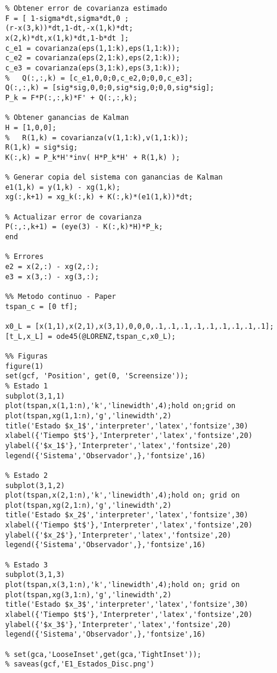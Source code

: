 \begin{verbatim}
	% Obtener error de covarianza estimado
	F = [ 1-sigma*dt,sigma*dt,0 ; 
	(r-x(3,k))*dt,1-dt,-x(1,k)*dt;
	x(2,k)*dt,x(1,k)*dt,1-b*dt ];
	c_e1 = covarianza(eps(1,1:k),eps(1,1:k));
	c_e2 = covarianza(eps(2,1:k),eps(2,1:k));
	c_e3 = covarianza(eps(3,1:k),eps(3,1:k));
	%   Q(:,:,k) = [c_e1,0,0;0,c_e2,0;0,0,c_e3];
	Q(:,:,k) = [sig*sig,0,0;0,sig*sig,0;0,0,sig*sig];
	P_k = F*P(:,:,k)*F' + Q(:,:,k);
	
	% Obtener ganancias de Kalman
	H = [1,0,0];
	%   R(1,k) = covarianza(v(1,1:k),v(1,1:k));
	R(1,k) = sig*sig;
	K(:,k) = P_k*H'*inv( H*P_k*H' + R(1,k) );
	
	% Generar copia del sistema con ganancias de Kalman
	e1(1,k) = y(1,k) - xg(1,k);
	xg(:,k+1) = xg_k(:,k) + K(:,k)*(e1(1,k))*dt;
	
	% Actualizar error de covarianza
	P(:,:,k+1) = (eye(3) - K(:,k)*H)*P_k;  
	end
	
	% Errores
	e2 = x(2,:) - xg(2,:);
	e3 = x(3,:) - xg(3,:);
	
	%% Metodo continuo - Paper
	tspan_c = [0 tf];
	
	x0_L = [x(1,1),x(2,1),x(3,1),0,0,0,.1,.1,.1,.1,.1,.1,.1,.1,.1];
	[t_L,x_L] = ode45(@LORENZ,tspan_c,x0_L);
	
	%% Figuras
	figure(1)
	set(gcf, 'Position', get(0, 'Screensize'));
	% Estado 1
	subplot(3,1,1)
	plot(tspan,x(1,1:n),'k','linewidth',4);hold on;grid on
	plot(tspan,xg(1,1:n),'g','linewidth',2)
	title('Estado $x_1$','interpreter','latex','fontsize',30)
	xlabel({'Tiempo $t$'},'Interpreter','latex','fontsize',20)
	ylabel({'$x_1$'},'Interpreter','latex','fontsize',20)
	legend({'Sistema','Observador',},'fontsize',16)
	
	% Estado 2
	subplot(3,1,2)
	plot(tspan,x(2,1:n),'k','linewidth',4);hold on; grid on
	plot(tspan,xg(2,1:n),'g','linewidth',2)
	title('Estado $x_2$','interpreter','latex','fontsize',30)
	xlabel({'Tiempo $t$'},'Interpreter','latex','fontsize',20)
	ylabel({'$x_2$'},'Interpreter','latex','fontsize',20)
	legend({'Sistema','Observador',},'fontsize',16)
	
	% Estado 3
	subplot(3,1,3)
	plot(tspan,x(3,1:n),'k','linewidth',4);hold on; grid on
	plot(tspan,xg(3,1:n),'g','linewidth',2)
	title('Estado $x_3$','interpreter','latex','fontsize',30)
	xlabel({'Tiempo $t$'},'Interpreter','latex','fontsize',20)
	ylabel({'$x_3$'},'Interpreter','latex','fontsize',20)
	legend({'Sistema','Observador',},'fontsize',16)
	
	% set(gca,'LooseInset',get(gca,'TightInset'));
	% saveas(gcf,'E1_Estados_Disc.png')
	

\end{verbatim}
